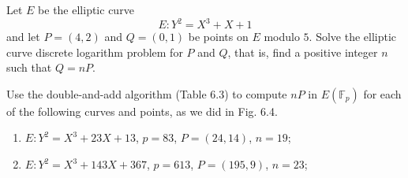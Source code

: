 \begin{exercise}{6.8}
    Let \( E \) be the elliptic curve
    \[
    E : Y^2 = X^3 + X + 1
    \]
    and let \( P = (4, 2) \) and \( Q = (0, 1) \) be points on \( E \) modulo \( 5 \). Solve the elliptic curve discrete logarithm problem for \( P \) and \( Q \), that is, find a positive integer \( n \) such that \( Q = nP \).
\end{exercise}




\begin{exercise}{6.11}
    Use the double-and-add algorithm (Table 6.3) to compute \( nP \) in \( E(\mathbb{F}_p) \) for each of the following curves and points, as we did in Fig. 6.4.
    \begin{enumerate}
        \item \( E : Y^2 = X^3 + 23X + 13 \), \( p = 83 \), \( P = (24, 14) \), \( n = 19 \);
        \item \( E : Y^2 = X^3 + 143X + 367 \), \( p = 613 \), \( P = (195, 9) \), \( n = 23 \);
    \end{enumerate}
\end{exercise}

